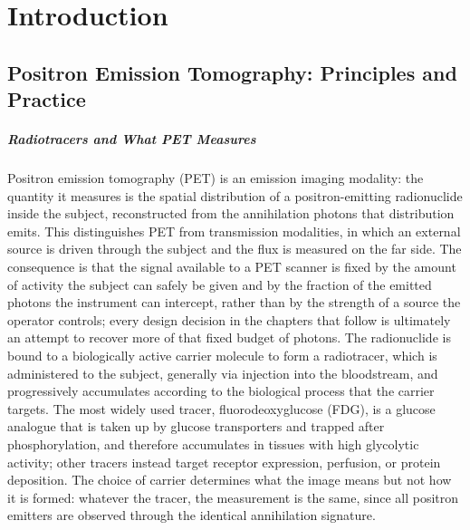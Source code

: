 \chapter{Introduction}
\label{ch:introduction}

\section{Positron Emission Tomography: Principles and Practice}

\paragraph{Radiotracers and What PET Measures}
Positron emission tomography (PET) is an emission imaging modality: the quantity it measures is the spatial distribution of a positron-emitting radionuclide inside the subject, reconstructed from the annihilation photons that distribution emits.
This distinguishes PET from transmission modalities, in which an external source is driven through the subject and the flux is measured on the far side.
The consequence is that the signal available to a PET scanner is fixed by the amount of activity the subject can safely be given and by the fraction of the emitted photons the instrument can intercept, rather than by the strength of a source the operator controls; every design decision in the chapters that follow is ultimately an attempt to recover more of that fixed budget of photons.
The radionuclide is bound to a biologically active carrier molecule to form a radiotracer, which is administered to the subject, generally via injection into the bloodstream, and progressively accumulates according to the biological process that the carrier targets.
The most widely used tracer, fluorodeoxyglucose (FDG), is a glucose analogue that is taken up by glucose transporters and trapped after phosphorylation, and therefore accumulates in tissues with high glycolytic activity; other tracers instead target receptor expression, perfusion, or protein deposition.
The choice of carrier determines what the image means but not how it is formed: whatever the tracer, the measurement is the same, since all positron emitters are observed through the identical  annihilation signature.

